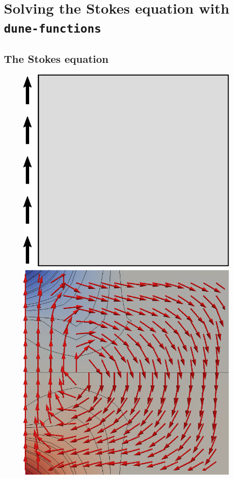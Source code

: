 \documentclass[a4paper,10pt,headings=normal,bibliography=totoc]{scrartcl}
\newcommand{\dunemodule}[1]{\texttt{#1}}
\begin{document}
\section{Solving the Stokes equation with \dunemodule{dune-functions}}
\label{sec:stokes_example}

\subsection{The Stokes equation}

\begin{figure}
 \begin{center}
  \includegraphics[height=0.3\textheight]{driven_cavity}
  \qquad
  \includegraphics[height=0.3\textheight]{driven_cavity_result}

\end{center}
\end{figure}
\end{document}
